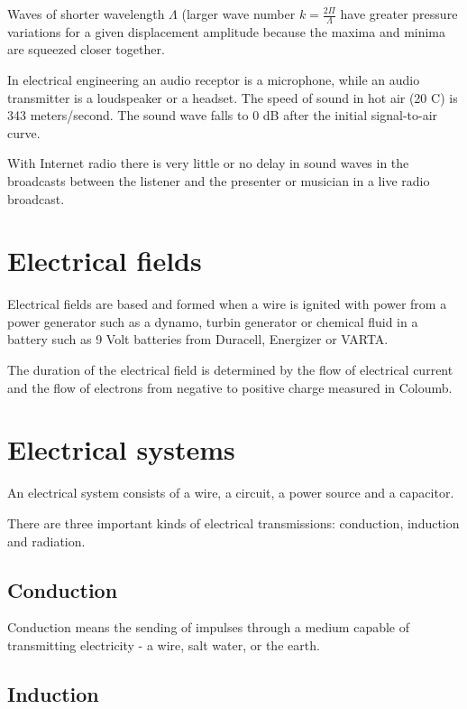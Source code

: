 \documentclass[a4paper,norsk,utf8]{report}
\begin{document}
    Waves of shorter wavelength $\Lambda$ (larger wave number $k = 
    \frac{2\Pi}{\Lambda}$ have greater pressure variations for a given 
    displacement amplitude because the maxima and minima are squeezed closer 
    together.
    
    In electrical engineering an audio receptor is a microphone, while
    an audio transmitter is a loudspeaker or a headset.  The speed of
    sound in hot air (20 C) is 343 meters/second.
    The sound wave falls to 0 dB after the initial signal-to-air curve.

    With Internet radio there is very little or no delay in sound waves in
    the broadcasts between the listener and the presenter or musician in a
    live radio broadcast.

\chapter{Electrical fields}

    Electrical fields are based and formed when a wire is ignited with
    power from a power generator such as a dynamo, turbin generator or
    chemical fluid in a battery such as 9 Volt batteries from Duracell,
    Energizer or VARTA.

    The duration of the electrical field is determined by the flow
    of electrical current and the flow of electrons from negative to
    positive charge measured in Coloumb.

\chapter{Electrical systems}

    An electrical system consists of a wire, a circuit, a power
    source and a capacitor.

    There are three important kinds of electrical transmissions:
    conduction, induction and radiation.

\section{Conduction}

    Conduction means the sending of impulses through a medium capable
    of transmitting electricity - a wire, salt water, or the earth.

\section{Induction}
\end{document}
